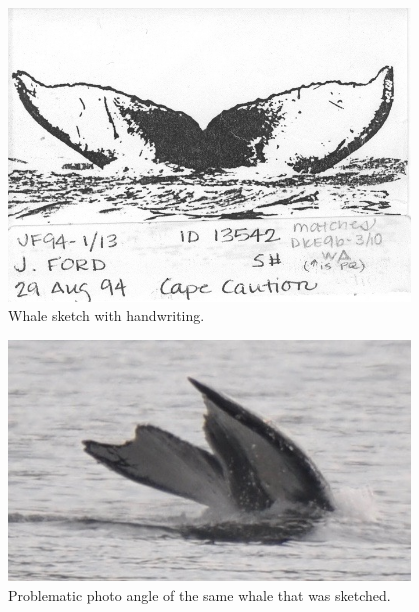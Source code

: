 \documentclass[12pt,
    brazil,			%
	english,        %
	]{article}
\begin{document}
\begin{figure}
    \centering
    \includegraphics[width=0.95\textwidth]{images/whales/0e6abdd05.jpg}
    \caption{Whale sketch with handwriting.}
    \label{fig:whale:0e6abdd05}
\end{figure}

\begin{figure}
    \centering
    \includegraphics[width=0.95\textwidth]{images/whales/d6dce5f26.jpg}
    \caption{Problematic photo angle of the same whale that was sketched.}
    \label{fig:whale:d6dce5f26}
\end{figure}



\end{document}
